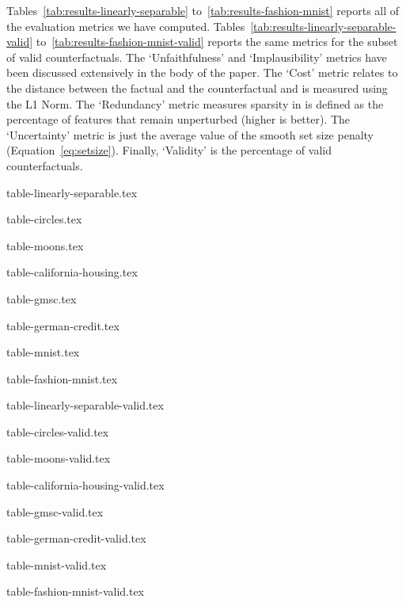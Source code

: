 Tables~\ref{tab:results-linearly-separable} to~\ref{tab:results-fashion-mnist} reports all of the evaluation metrics we have computed. Tables~\ref{tab:results-linearly-separable-valid} to~\ref{tab:results-fashion-mnist-valid} reports the same metrics for the subset of valid counterfactuals. The `Unfaithfulness' and `Implausibility' metrics have been discussed extensively in the body of the paper. The `Cost' metric relates to the distance between the factual and the counterfactual and is measured using the L1 Norm. The `Redundancy' metric measures sparsity in is defined as the percentage of features that remain unperturbed (higher is better). The `Uncertainty' metric is just the average value of the smooth set size penalty (Equation~\ref{eq:setsize}). Finally, `Validity' is the percentage of valid counterfactuals. 

{table-linearly-separable.tex}

{table-circles.tex}

{table-moons.tex}

{table-california-housing.tex}

{table-gmsc.tex}

{table-german-credit.tex}

{table-mnist.tex}

{table-fashion-mnist.tex}

{table-linearly-separable-valid.tex}

{table-circles-valid.tex}

{table-moons-valid.tex}

{table-california-housing-valid.tex}

{table-gmsc-valid.tex}

{table-german-credit-valid.tex}

{table-mnist-valid.tex}

{table-fashion-mnist-valid.tex}